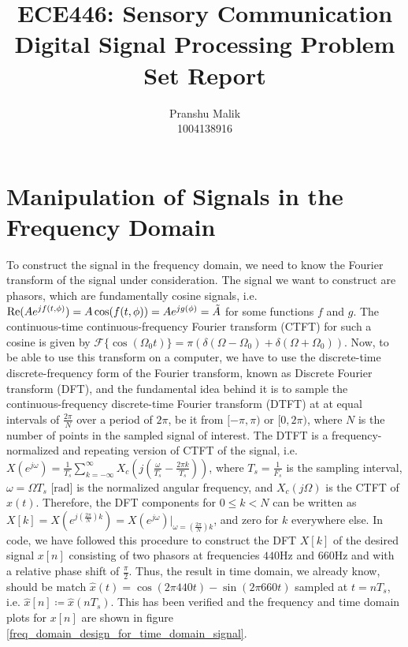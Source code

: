 \documentclass[10pt]{article}
\date{}
\begin{document}
\title{\textbf{\Large{\textsc{ECE446:} Sensory Communication}} \\ \Large{Digital Signal Processing Problem Set Report}\vspace{-0.3cm}}
\author{Pranshu Malik\\ \footnotesize{1004138916}\vspace{-3cm}}

\maketitle

\section{Manipulation of Signals in the Frequency Domain}
To construct the signal in the frequency domain, we need to know the Fourier transform of the signal under consideration. The signal we want to construct are phasors, which are fundamentally cosine signals, i.e. $\text{Re}(Ae^{jf(t,\phi)}) = A\cos(f(t,\phi)) = Ae^{jg(\phi)} = \Tilde{A}$ for some functions $f$ and $g$. The continuous-time continuous-frequency Fourier transform (CTFT) for such a cosine is given by $\mathcal{F}\{\cos(\Omega_0t)\} = \pi(\delta(\Omega - \Omega_0) + \delta(\Omega + \Omega_0))$. Now, to be able to use this transform on a computer, we have to use the discrete-time discrete-frequency form of the Fourier transform, known as Discrete Fourier transform (DFT), and the fundamental idea behind it is to sample the continuous-frequency discrete-time Fourier transform (DTFT) at at equal intervals of $\frac{2\pi}{N}$ over a period of $2\pi$, be it from $[-\pi, \pi)$ or $[0, 2\pi)$, where $N$ is the number of points in the sampled signal of interest. The DTFT is a frequency-normalized and repeating version of CTFT of the signal, i.e. $X(e^{j\omega}) = \frac{1}{T_s}\sum_{k=-\infty}^{\infty}X_c(j(\frac{\omega}{T_s} - \frac{2\pi k}{T_s}))$, where $T_s = \frac{1}{F_s}$ is the sampling interval, $\omega = \Omega T_s \text{ [rad]}$ is the normalized angular frequency, and $X_c(j\Omega)$ is the CTFT of $x(t)$. Therefore, the DFT components for $0\leq k < N$ can be written as $X[k] = X(e^{j(\frac{2\pi}{N})k}) = X(e^{j\omega})\rvert_{\omega = (\frac{2\pi}{N})k}$, and zero for $k$ everywhere else. In code, we have followed this procedure to construct the DFT $X[k]$ of the desired signal $x[n]$ consisting of two phasors at frequencies $440$Hz and $660$Hz and with a relative phase shift of $\frac{\pi}{2}$. Thus, the result in time domain, we already know, should be match $\hat{x}(t) = \cos(2\pi440t) - \sin(2\pi660t)$ sampled at $t = nT_s$, i.e. $\hat{x}[n] \coloneqq \hat{x}(nT_s)$. This has been verified and the frequency and time domain plots for $x[n]$ are shown in figure \ref{freq_domain_design_for_time_domain_signal}.
\end{document}
